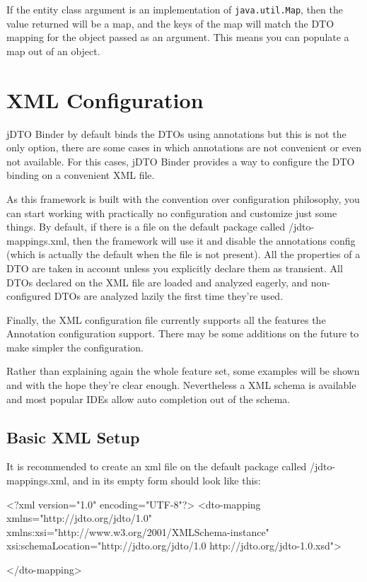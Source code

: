 \documentclass[11pt]{article}
\newcommand{\JDTO}{jDTO Binder\xspace}
\newcommand{\DEFAULTCONFIG}{/jdto-mappings.xml\xspace}
\begin{document}
If the entity class argument is an implementation of \texttt{java.util.Map}, then the value returned will be a map, and the keys of the map will match the DTO mapping for the object passed as an argument. This means you can populate a map out of an object.


\section{XML Configuration}

\JDTO by default binds the DTOs using annotations but this is not the only option, there are some cases in which annotations are not convenient or even not available. For this cases, \JDTO provides a way to configure the DTO binding on a convenient XML file.

As this framework is built with the convention over configuration philosophy, you can start working with practically no configuration and customize just some things. By default, if there is a file on the default package called \DEFAULTCONFIG, then the framework will use it and disable the annotations config (which is actually the default when the file is not present). All the properties of a DTO are taken in account unless you explicitly declare them as transient. All DTOs declared on the XML file are loaded and analyzed eagerly, and non-configured DTOs are analyzed lazily the first time they're used.

Finally, the XML configuration file currently supports all the features the Annotation configuration support. There may be some additions on the future to make simpler the configuration.


Rather than explaining again the whole feature set, some examples will be shown and with the hope they're clear enough. Nevertheless a XML schema is available and most popular IDEs allow auto completion out of the schema.


\subsection{Basic XML Setup}

It is recommended to create an xml file on the default package called \DEFAULTCONFIG, and in its empty form should look like this:

\begin{xml}
<?xml version="1.0" encoding="UTF-8"?>
<dto-mapping 
    xmlns="http://jdto.org/jdto/1.0" 
    xmlns:xsi="http://www.w3.org/2001/XMLSchema-instance"
    xsi:schemaLocation="http://jdto.org/jdto/1.0 
                        http://jdto.org/jdto-1.0.xsd">
        
</dto-mapping>
\end{xml}
\end{document}
